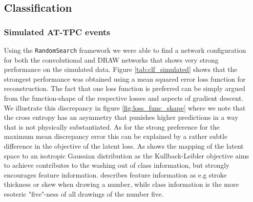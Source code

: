 \subsection{Classification}
\subsubsection{Simulated AT-TPC events}
Using the \lstinline{RandomSearch} framework we were able to find a network configuration for both the convolutional and DRAW networks that shows very strong performance on the simulated data. Figure \ref{tab:clf_simulated} shows that the strongest performance was obtained using a mean squared error loss function for reconstruction. The fact that one loss function is preferred can be simply argued from the function-shape of the respective losses and aspects of gradient descent. We illustrate this discrepancy in figure \ref{fig:loss_func_shape} where we note that the cross entropy has an asymmetry that punishes higher predictions in a way that is not physically substantiated. As for the strong preference for the maximum mean discrepancy error this can be explained by a rather subtle difference in the objective of the latent loss. As \citet{Antoran2019} shows the mapping of the latent space to an isotropic Gaussian distribution as the Kullback-Leibler objective aims to achieve contributes to the washing out of class information, but strongly encourages feature information. \citet{Antoran2019} describes feature information as e.g stroke thickness or skew when drawing a number, while class information is the more esoteric "five"-ness of all drawings of the number five.

